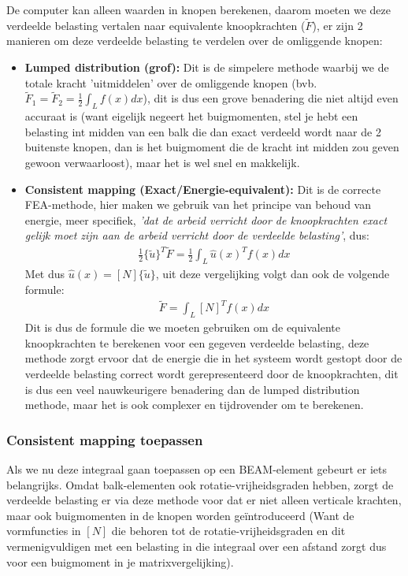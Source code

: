 \documentclass[a4paper,11pt,twoside]{report}
\begin{document}
De computer kan alleen waarden in knopen berekenen, daarom moeten we deze verdeelde belasting
vertalen naar equivalente knoopkrachten ($\tilde{F}$), er zijn 2 manieren om deze verdeelde
belasting te verdelen over de omliggende knopen:
\begin{itemize}
    \item \textbf{Lumped distribution (grof):} Dit is de simpelere methode waarbij we de totale kracht
          'uitmiddelen' over de omliggende knopen (bvb.
          $\tilde{F}_1 = \tilde{F}_2 = \frac{1}{2} \int_L^{} f(x) dx$), dit is dus een grove benadering die
          niet altijd even accuraat is (want eigelijk negeert het buigmomenten, stel je hebt een belasting
          int midden van een balk die dan exact verdeeld wordt naar de 2 buitenste knopen, dan is het
          buigmoment die de kracht int midden zou geven gewoon verwaarloost), maar het is wel snel en
          makkelijk.
    \item \textbf{Consistent mapping (Exact/Energie-equivalent):} Dit is de correcte FEA-methode, hier
          maken we gebruik van het principe van behoud van energie, meer specifiek, \textit{'dat de arbeid
              verricht door de knoopkrachten exact gelijk moet zijn aan de arbeid verricht door de verdeelde
              belasting'}, dus:
          \begin{align*}
              \frac{1}{2} \{\tilde{u}\}^T \tilde{F} = \frac{1}{2}\int_L^{} \hat{u}(x)^T f(x) dx
          \end{align*}
          Met dus $\hat{u}(x) = [N] \{\tilde{u}\}$, uit deze vergelijking volgt dan ook de volgende formule:
          \begin{align*}
              \tilde{F} = \int_L^{} [N]^T f(x) dx
          \end{align*}
          Dit is dus de formule die we moeten gebruiken om de equivalente knoopkrachten te berekenen voor een
          gegeven verdeelde belasting, deze methode zorgt ervoor dat de energie die in het systeem wordt
          gestopt door de verdeelde belasting correct wordt gerepresenteerd door de knoopkrachten, dit is dus
          een veel nauwkeurigere benadering dan de lumped distribution methode, maar het is ook complexer en
          tijdrovender om te berekenen.
\end{itemize}
\subsubsection{Consistent mapping toepassen}
Als we nu deze integraal gaan toepassen op een BEAM-element gebeurt er iets belangrijks. Omdat
balk-elementen ook rotatie-vrijheidsgraden hebben, zorgt de verdeelde belasting er via deze methode
voor dat er niet alleen verticale krachten, maar ook buigmomenten in de knopen worden geïntroduceerd
(Want de vormfuncties in $[N]$ die behoren tot de rotatie-vrijheidsgraden en dit vermenigvuldigen
met een belasting in die integraal over een afstand zorgt dus voor een buigmoment in je
matrixvergelijking).
\end{document}
